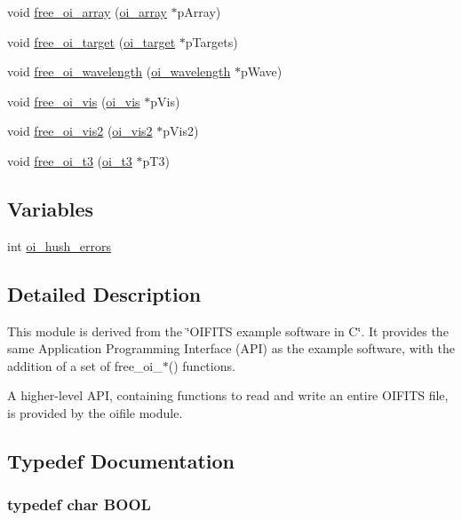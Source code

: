 \begin{DoxyCompactItemize}
\item 
void \hyperlink{group__oitable_gaa4b06f2b9fc01b4fe3115457554d43fa}{free\_\-oi\_\-array} (\hyperlink{structoi__array}{oi\_\-array} $\ast$pArray)
\item 
void \hyperlink{group__oitable_gadc9eebf0079ab77f472f2577da42c591}{free\_\-oi\_\-target} (\hyperlink{structoi__target}{oi\_\-target} $\ast$pTargets)
\item 
void \hyperlink{group__oitable_gad7c24eb342d88ad5f22178426f69fa56}{free\_\-oi\_\-wavelength} (\hyperlink{structoi__wavelength}{oi\_\-wavelength} $\ast$pWave)
\item 
void \hyperlink{group__oitable_ga244851af58b93c4445a3eeddb9f794b7}{free\_\-oi\_\-vis} (\hyperlink{structoi__vis}{oi\_\-vis} $\ast$pVis)
\item 
void \hyperlink{group__oitable_ga109b89eb6ed055562f7c207de9d316a3}{free\_\-oi\_\-vis2} (\hyperlink{structoi__vis2}{oi\_\-vis2} $\ast$pVis2)
\item 
void \hyperlink{group__oitable_ga4a228cff5256bffc18536c8d657a94bb}{free\_\-oi\_\-t3} (\hyperlink{structoi__t3}{oi\_\-t3} $\ast$pT3)
\end{DoxyCompactItemize}
\subsection*{Variables}
\begin{DoxyCompactItemize}
\item 
int \hyperlink{group__oitable_gac7d4f8c8c2af780602abafd4e44d59f8}{oi\_\-hush\_\-errors}
\end{DoxyCompactItemize}


\subsection{Detailed Description}
This module is derived from the \char`\"{}OIFITS example software in C\char`\"{}. It provides the same Application Programming Interface (API) as the example software, with the addition of a set of free\_\-oi\_\-$\ast$() functions.

A higher-\/level API, containing functions to read and write an entire OIFITS file, is provided by the oifile module. 

\subsection{Typedef Documentation}
\hypertarget{group__oitable_gaf492d2bddcb2befacb3aa03dcdf9aafd}{
\subsubsection[{BOOL}]{\setlength{\rightskip}{0pt plus 5cm}typedef char {\bf BOOL}}}
\label{group__oitable_gaf492d2bddcb2befacb3aa03dcdf9aafd}



